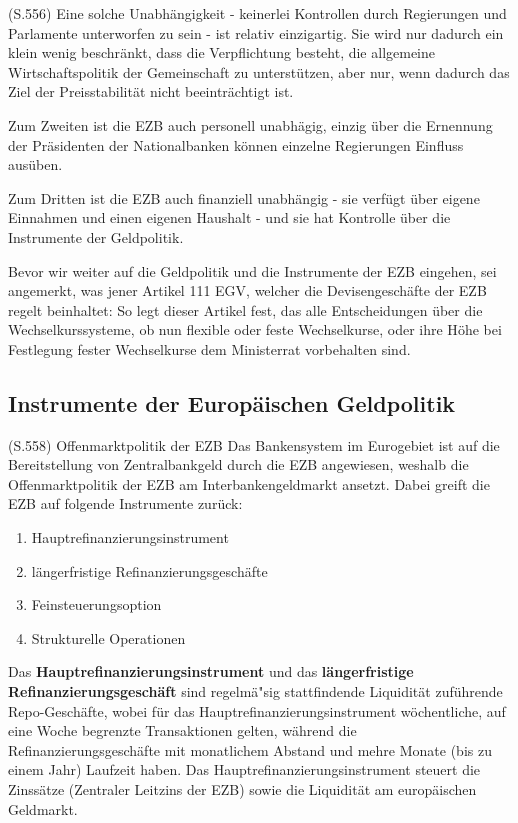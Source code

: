 \documentclass[
    onecolumn,
    a4paper,
    abstracton,
    parskip=half
    ,final
    ]{scrartcl}
\begin{document}
(S.556)
Eine solche Unabh{\"a}ngigkeit - keinerlei Kontrollen durch Regierungen und Parlamente unterworfen zu sein -  ist relativ einzigartig. Sie wird nur dadurch ein klein wenig beschr{\"a}nkt, dass die Verpflichtung besteht, die allgemeine Wirtschaftspolitik der Gemeinschaft zu unterst{\"u}tzen, aber nur, wenn dadurch das Ziel der Preisstabilit{\"a}t nicht beeintr{\"a}chtigt ist.

Zum Zweiten ist die EZB auch personell unabh{\"a}gig, einzig {\"u}ber die Ernennung der Pr{\"a}sidenten der Nationalbanken k{\"o}nnen einzelne Regierungen Einfluss aus{\"u}ben.

Zum Dritten ist die EZB auch finanziell unabh{\"a}ngig - sie verf{\"u}gt {\"u}ber eigene Einnahmen und einen eigenen Haushalt - und sie hat Kontrolle {\"u}ber die Instrumente der Geldpolitik.


Bevor wir weiter auf die Geldpolitik und die Instrumente der EZB eingehen, sei angemerkt, was jener Artikel 111 EGV, welcher die Devisengesch{\"a}fte der EZB regelt beinhaltet:
So legt dieser Artikel fest, das alle Entscheidungen {\"u}ber die Wechselkurssysteme, ob nun flexible oder feste Wechselkurse, oder ihre H{\"o}he bei Festlegung fester Wechselkurse dem Ministerrat vorbehalten sind. \citep[vgl.][S.555]{Basseler2010}




\subsection{Instrumente der Europ{\"a}ischen Geldpolitik}
(S.558)
Offenmarktpolitik der EZB
Das Bankensystem im Eurogebiet ist auf die Bereitstellung von Zentralbankgeld durch die EZB angewiesen, weshalb die Offenmarktpolitik der EZB am Interbankengeldmarkt ansetzt. Dabei greift die EZB auf folgende Instrumente zur{\"u}ck:
\begin{enumerate}
  \item{Hauptrefinanzierungsinstrument}
  \item{l{\"a}ngerfristige Refinanzierungsgesch{\"a}fte}
  \item{Feinsteuerungsoption}
  \item{Strukturelle Operationen}
  \end{enumerate}

Das \textbf{Hauptrefinanzierungsinstrument} und das \textbf{l{\"a}ngerfristige Refinanzierungsgesch{\"a}ft} sind regelm{\"a}{"s}ig stattfindende Liquidit{\"a}t zuf{\"u}hrende Repo-Gesch{\"a}fte, wobei f{\"u}r das Hauptrefinanzierungsinstrument w{\"o}chentliche, auf eine Woche begrenzte Transaktionen gelten, w{\"a}hrend die Refinanzierungsgesch{\"a}fte mit monatlichem Abstand und mehre Monate (bis zu einem Jahr) Laufzeit haben. Das Hauptrefinanzierungsinstrument steuert die Zinss{\"a}tze (Zentraler Leitzins der EZB) sowie die Liquidit{\"a}t am europ{\"a}ischen Geldmarkt.
\end{document}
